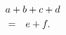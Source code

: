 \documentclass{article}
\begin{document}
\begin{eqnarray}
\lefteqn{a+b+c+d}&&\nonumber\\
&=& e+f.
\end{eqnarray}
\end{document}
